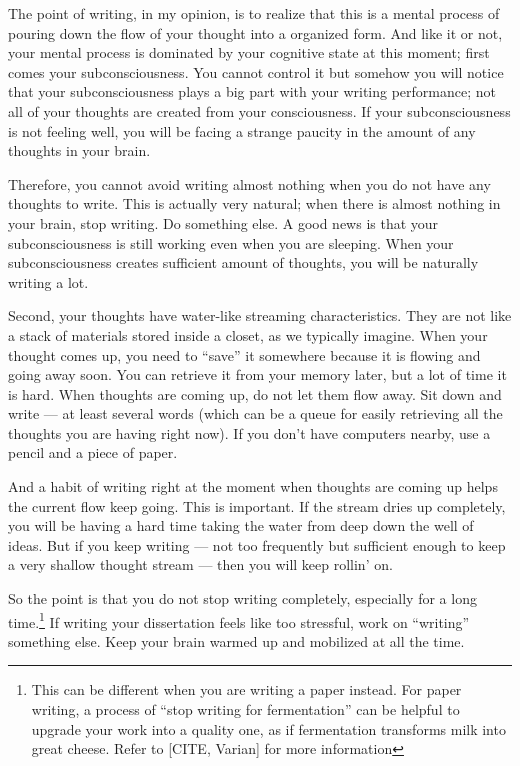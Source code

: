 \documentclass[11pt]{article}
\begin{document}
The point of writing, in my opinion, is to realize that this is a
mental process of pouring down the flow of your thought into a
organized form.  And like it or not, your mental process is
dominated by your cognitive state at this moment; first comes your
subconsciousness. You cannot control it but somehow you will
notice that your subconsciousness plays a big part with your
writing performance; not all of your thoughts are created from
your consciousness. If your subconsciousness is not feeling well,
you will be facing a strange paucity in the amount of any thoughts
in your brain.

Therefore, you cannot avoid writing almost nothing when you do not
have any thoughts to write. This is actually very natural; when
there is almost nothing in your brain, stop writing. Do something
else. A good news is that your subconsciousness is still working
even when you are sleeping.  When your subconsciousness creates
sufficient amount of thoughts, you will be naturally writing a
lot. 

Second, your thoughts have water-like streaming characteristics.
They are not like a stack of materials stored inside a closet, as
we typically imagine.  When your thought comes up, you need to
``save'' it somewhere because it is flowing and going away soon.
You can retrieve it from your memory later, but a lot of time it
is hard. When thoughts are coming up, do not let them flow away.
Sit down and write --- at least several words (which can be a
queue for easily retrieving all the thoughts you are having right
now). If you don't have computers nearby, use a pencil and a piece
of paper. 

And a habit of writing right at the moment when thoughts are
coming up helps the current flow keep going. This is important. If
the stream dries up completely, you will be having a hard time
taking the water from deep down the well of ideas.  But if you
keep writing --- not too frequently but sufficient enough to keep
a very shallow thought stream --- then you will keep rollin' on.

So the point is that you do not stop writing completely,
especially for a long time.\footnote{This can be different when
    you are writing a paper instead. For paper writing, a process
    of ``stop writing for fermentation'' can be helpful to upgrade
    your work into a quality one, as if fermentation transforms milk
into great cheese. Refer to [CITE, Varian] for more information}
If writing your dissertation feels like too stressful, work on
``writing'' something else. Keep your brain warmed up and
mobilized at all the time.
\end{document}
